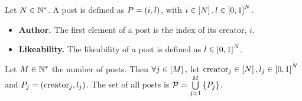 \begin{definition}[Post]
  Let $N \in \mathbb{N}^*$. A post is defined as $P = \left(i,
  l\right)$, with $i \in \left[N\right], l \in \left[0,
  1\right]^N$.
  \begin{itemize}
    \item \textbf{Author.} The first element of a post is the index of its
    creator, $i$.

    \item \textbf{Likeability.} The likeability of a post is defined as
    $l \in \left[0, 1\right]^N$.
  \end{itemize}
  Let $M \in \mathbb{N}^*$ the number of posts. Then $\forall j \in
  \left[M\right],$ let $\mathrm{creator}_j \in
  \left[N\right], l_j \in \left[0, 1\right]^N$ and
  $P_j = \left(\mathrm{creator}_j, l_j\right)$. The set of all posts
  is $\mathcal{P} = \bigcup\limits_{j=1}^M \left\{P_j\right\}$.
\end{definition}
